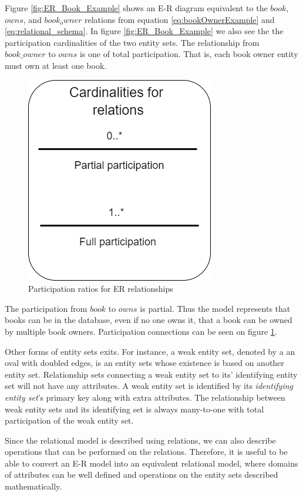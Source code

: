Figure \ref{fig:ER_Book_Example} shows an E-R diagram equivalent to the $book$, $owns$, and $book_owner$ relations from equation \ref{eq:bookOwnerExample} and \ref{eq:relational_schema}.
In figure \ref{fig:ER_Book_Example} we also see the  the participation cardinalities of the two entity sets. 
The relationship from $book\_owner$ to $owns$ is one of total participation. That is, each book owner entity must own at least one book.
\begin{figure}[h]
    \centering
    \includegraphics[scale=0.5]{Images/cardinalities.png}
    \caption{Participation ratios for ER relationships}
    \label{fig:ERDiagram_Cardinality}
\end{figure}
The participation from $book$ to $owns$ is partial. Thus the model represents that books can be in the database, even if no one owns it, that a book can be owned by multiple book owners.
Participation connections can be seen on figure \ref{fig:ERDiagram_Cardinality}.


Other forms of entity sets exits. For instance, a weak entity set, denoted by a an oval with doubled edges, is an entity sets whose existence is based on another entity set. Relationship sets connecting a weak entity set to its' identifying entity set will not have any attributes.
A weak entity set is identified by its \textit{identifying entity set}'s primary key along with extra attributes. 
The relationship between weak entity sets and its identifying set is always many-to-one with total  participation of the weak entity set.

Since the relational model is described using relations, we can also describe operations that can be performed on the relations.
Therefore, it is useful to be able to convert an E-R model into an equivalent relational model, where domains of attributes can be well defined and operations on the entity sets described mathematically.

